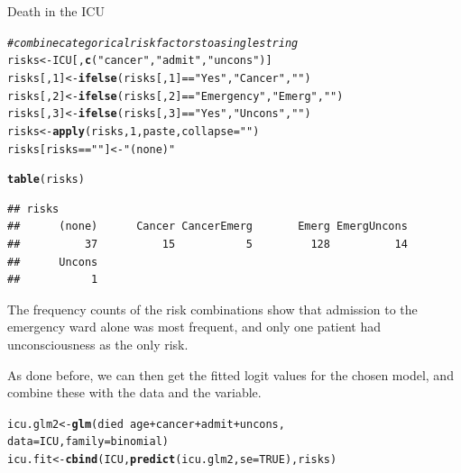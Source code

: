 \documentclass[11pt]{book}\usepackage[]{graphicx}\usepackage[]{color}
\makeatletter
\newcommand{\hlnum}[1]{\textcolor[rgb]{0.686,0.059,0.569}{#1}}%
\newcommand{\hlstr}[1]{\textcolor[rgb]{0.192,0.494,0.8}{#1}}%
\newcommand{\hlcom}[1]{\textcolor[rgb]{0.678,0.584,0.686}{\textit{#1}}}%
\newcommand{\hlopt}[1]{\textcolor[rgb]{0,0,0}{#1}}%
\newcommand{\hlstd}[1]{\textcolor[rgb]{0.345,0.345,0.345}{#1}}%
\newcommand{\hlkwb}[1]{\textcolor[rgb]{0.69,0.353,0.396}{#1}}%
\newcommand{\hlkwc}[1]{\textcolor[rgb]{0.333,0.667,0.333}{#1}}%
\newcommand{\hlkwd}[1]{\textcolor[rgb]{0.737,0.353,0.396}{\textbf{#1}}}%
\newenvironment{kframe}{%
 \def\at@end@of@kframe{}%
 \ifinner\ifhmode%
  \def\at@end@of@kframe{\end{minipage}}%
  \begin{minipage}{\columnwidth}%
 \fi\fi%
 \def\FrameCommand##1{\hskip\@totalleftmargin \hskip-\fboxsep
 \colorbox{shadecolor}{##1}\hskip-\fboxsep
     \hskip-\linewidth \hskip-\@totalleftmargin \hskip\columnwidth}%
 \MakeFramed {\advance\hsize-\width
   \@totalleftmargin\z@ \linewidth\hsize
   \@setminipage}}%
 {\par\unskip\endMakeFramed%
 \at@end@of@kframe}
\newenvironment{knitrout}{}{} %
\renewenvironment{knitrout}{\small\renewcommand{\baselinestretch}{.85}}{} %
\makeatother
\begin{document}
\begin{Example}[icu1]{Death in the ICU}
\begin{knitrout}\footnotesize
{}\color{fgcolor}\begin{kframe}
\begin{alltt}
\hlcom{# combine categorical risk factors to a single string}
\hlstd{risks} \hlkwb{<-} \hlstd{ICU[,} \hlkwd{c}\hlstd{(}\hlstr{"cancer"}\hlstd{,} \hlstr{"admit"}\hlstd{,} \hlstr{"uncons"}\hlstd{)]}
\hlstd{risks[,}\hlnum{1}\hlstd{]} \hlkwb{<-} \hlkwd{ifelse}\hlstd{(risks[,}\hlnum{1}\hlstd{]}\hlopt{==}\hlstr{"Yes"}\hlstd{,} \hlstr{"Cancer"}\hlstd{,} \hlstr{""}\hlstd{)}
\hlstd{risks[,}\hlnum{2}\hlstd{]} \hlkwb{<-} \hlkwd{ifelse}\hlstd{(risks[,}\hlnum{2}\hlstd{]}\hlopt{==}\hlstr{"Emergency"}\hlstd{,} \hlstr{"Emerg"}\hlstd{,} \hlstr{""}\hlstd{)}
\hlstd{risks[,}\hlnum{3}\hlstd{]} \hlkwb{<-} \hlkwd{ifelse}\hlstd{(risks[,}\hlnum{3}\hlstd{]}\hlopt{==}\hlstr{"Yes"}\hlstd{,} \hlstr{"Uncons"}\hlstd{,} \hlstr{""}\hlstd{)}
\hlstd{risks} \hlkwb{<-} \hlkwd{apply}\hlstd{(risks,} \hlnum{1}\hlstd{, paste,} \hlkwc{collapse}\hlstd{=}\hlstr{""}\hlstd{)}
\hlstd{risks[risks}\hlopt{==}\hlstr{""}\hlstd{]} \hlkwb{<-} \hlstr{"(none)"}
\end{alltt}
\end{kframe}
\end{knitrout}
\begin{knitrout}\footnotesize
{}\color{fgcolor}\begin{kframe}
\begin{alltt}
\hlkwd{table}\hlstd{(risks)}
\end{alltt}
\begin{verbatim}
## risks
##      (none)      Cancer CancerEmerg       Emerg EmergUncons 
##          37          15           5         128          14 
##      Uncons 
##           1
\end{verbatim}
\end{kframe}
\end{knitrout}
The frequency counts of the risk combinations show that admission to the
emergency ward alone was most frequent, and only one patient had
unconsciousness as the only risk.

As done before, we can then get the fitted logit values for the chosen model, 
and combine these with the data and the  variable.

\begin{knitrout}
\color{fgcolor}\begin{kframe}
\begin{alltt}
\hlstd{icu.glm2} \hlkwb{<-} \hlkwd{glm}\hlstd{(died} \hlopt{~} \hlstd{age} \hlopt{+} \hlstd{cancer}  \hlopt{+} \hlstd{admit} \hlopt{+} \hlstd{uncons,}
                \hlkwc{data}\hlstd{=ICU,} \hlkwc{family}\hlstd{=binomial)}
\hlstd{icu.fit} \hlkwb{<-} \hlkwd{cbind}\hlstd{(ICU,} \hlkwd{predict}\hlstd{(icu.glm2,} \hlkwc{se}\hlstd{=}\hlnum{TRUE}\hlstd{), risks)}
\end{alltt}
\end{kframe}
\end{knitrout}


\end{Example}
\end{document}

